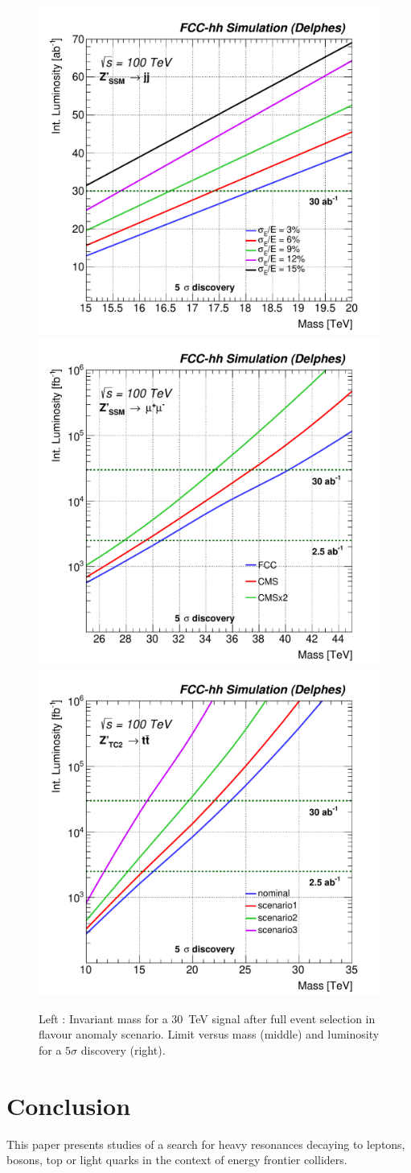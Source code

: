 \documentclass[a4paper,11pt]{article}
\begin{document}
\begin{figure}[!htb]
  \centering
    \includegraphics[width=0.32\columnwidth]{Fig/DiscoveryPotential_Zp_jj_comb_smeared_rootStyle-eps-converted-to.pdf}
  \includegraphics[width=0.32\columnwidth]{Fig/DiscoveryPotential_ll_smearhl_rootStyle-eps-converted-to.pdf}
  \includegraphics[width=0.32\columnwidth]{Fig/DiscoveryPotential_tt_TC2_tagger_TRFbtag_degrade_rootStyle-eps-converted-to.pdf}
  \caption{Left : Invariant mass for a 30~TeV signal after full event selection in flavour anomaly scenario. Limit versus mass (middle) and luminosity for a $5\sigma$ discovery (right). }
  \label{figure:detperf}
\end{figure}



\section{Conclusion}
\label{sec:conc}

This paper presents studies of a search for heavy resonances decaying to leptons, bosons, top or light quarks in the context of energy frontier colliders. 

\appendix
\end{document}
